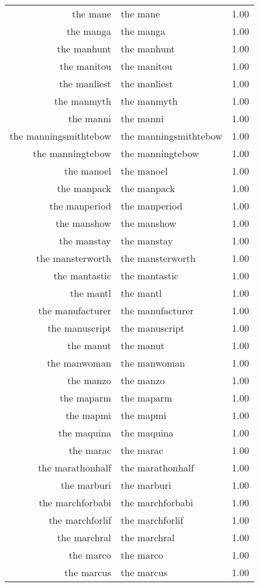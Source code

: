 \begin{table}[ht]
\begin{tabular}{rlr}
  the mane & the mane & 1.00 \\ 
  the manga & the manga & 1.00 \\ 
  the manhunt & the manhunt & 1.00 \\ 
  the manitou & the manitou & 1.00 \\ 
  the manliest & the manliest & 1.00 \\ 
  the manmyth & the manmyth & 1.00 \\ 
  the manni & the manni & 1.00 \\ 
  the manningsmithtebow & the manningsmithtebow & 1.00 \\ 
  the manningtebow & the manningtebow & 1.00 \\ 
  the manoel & the manoel & 1.00 \\ 
  the manpack & the manpack & 1.00 \\ 
  the manperiod & the manperiod & 1.00 \\ 
  the manshow & the manshow & 1.00 \\ 
  the manstay & the manstay & 1.00 \\ 
  the mansterworth & the mansterworth & 1.00 \\ 
  the mantastic & the mantastic & 1.00 \\ 
  the mantl & the mantl & 1.00 \\ 
  the manufacturer & the manufacturer & 1.00 \\ 
  the manuscript & the manuscript & 1.00 \\ 
  the manut & the manut & 1.00 \\ 
  the manwoman & the manwoman & 1.00 \\ 
  the manzo & the manzo & 1.00 \\ 
  the maparm & the maparm & 1.00 \\ 
  the mapmi & the mapmi & 1.00 \\ 
  the maquina & the maquina & 1.00 \\ 
  the marac & the marac & 1.00 \\ 
  the marathonhalf & the marathonhalf & 1.00 \\ 
  the marburi & the marburi & 1.00 \\ 
  the marchforbabi & the marchforbabi & 1.00 \\ 
  the marchforlif & the marchforlif & 1.00 \\ 
  the marchral & the marchral & 1.00 \\ 
  the marco & the marco & 1.00 \\ 
  the marcus & the marcus & 1.00 \\ 

\end{tabular}
\end{table}
